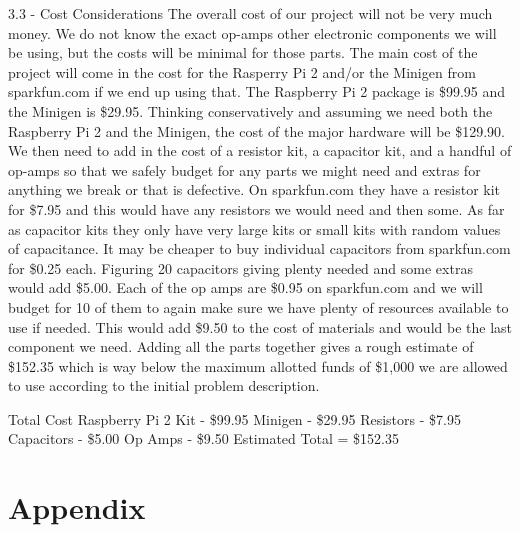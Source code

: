 \documentclass{article}	%
\begin{document}
\begin{multicols}{2}
3.3 - Cost Considerations
The overall cost of our project will not be very much money. We do not know the exact op-amps other electronic components we will be using, but the costs will be minimal for those parts. The main cost of the project will come in the cost for the Rasperry Pi 2 and/or the Minigen from sparkfun.com if we end up using that. The Raspberry Pi 2 package is \$99.95 and the Minigen is \$29.95. Thinking conservatively and assuming we need both the Raspberry Pi 2 and the Minigen, the cost of the major hardware will be \$129.90. We then need to add in the cost of a resistor kit, a capacitor kit, and a handful of op-amps so that we safely budget for any parts we might need and extras for anything we break or that is defective. On sparkfun.com they have a resistor kit for \$7.95 and this would have any resistors we would need and then some. As far as capacitor kits they only have very large kits or small kits with random values of capacitance. It may be cheaper to buy individual capacitors from sparkfun.com for \$0.25 each. Figuring 20 capacitors giving plenty needed and some extras would add \$5.00. Each of the op amps are \$0.95 on sparkfun.com and we will budget for 10 of them to again make sure we have plenty of resources available to use if needed. This would add \$9.50 to the cost of materials and would be the last component we need. Adding all the parts together gives a rough estimate of \$152.35 which is way below the maximum allotted funds of \$1,000 we are allowed to use according to the initial problem description.

Total Cost
Raspberry Pi 2 Kit - \$99.95
Minigen - \$29.95
Resistors - \$7.95
Capacitors - \$5.00
Op Amps - \$9.50
Estimated Total = \$152.35


\end{multicols}

\section{Appendix}
\end{document}
